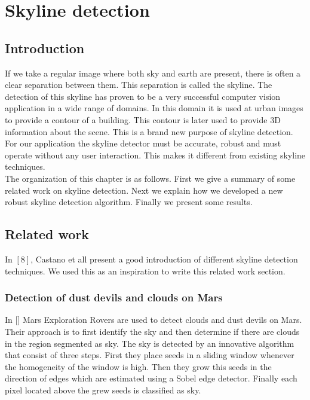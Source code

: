 

\section{Skyline detection}
 \subsection{Introduction}
If we take a regular image where both sky and earth are present, there
is often a clear separation between them. This separation is called the
skyline. %
The detection of this skyline has proven to be a very successful computer vision
application in a wide range of domains. In this domain it is used at urban
images to provide a contour of a building.  This contour is later used to
provide 3D information about the scene. This is a brand new purpose of skyline
detection.\\
For our application the skyline detector must be accurate, robust and must
operate without any user interaction. This makes it different from existing
skyline techniques.\\
The organization of this chapter is as follows.  First we give a summary of some
related work on skyline detection.  Next we explain how we developed a new
robust skyline detection algorithm.  Finally we present some results.

\subsection{Related work}
In $[8]$, Castano et all present a good introduction of different skyline
detection techniques. We used this as an inspiration to write this related work
section.


\subsubsection{Detection of dust devils and clouds on Mars}
In []%
Mars Exploration Rovers are used to detect clouds and dust devils on Mars.
Their approach is to first identify the sky and then determine if there are
clouds in the region segmented as sky. The sky is detected by an innovative
algorithm that consist of three steps.  First they place seeds in a sliding
window whenever the homogeneity of the window is high. Then they grow this seeds
in the direction of edges which are estimated using a Sobel edge detector.
Finally each pixel located above the grew seeds is classified as sky.\\

